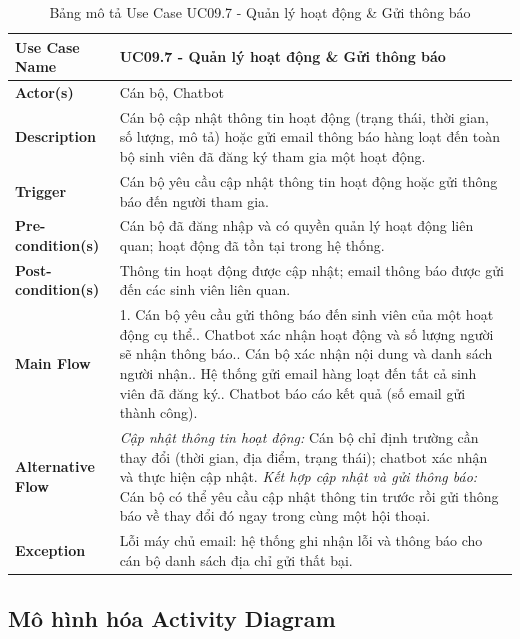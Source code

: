 \begin{table}[H]
	\centering
	\renewcommand{\arraystretch}{1.25}
	\begin{tabular}{|p{3.8cm}|p{11.2cm}|}
		\hline
		\textbf{Use Case Name} & \textbf{UC09.7 - Quản lý hoạt động \& Gửi thông báo} \\ \hline
		\textbf{Actor(s)} & Cán bộ, Chatbot \\ \hline
		\textbf{Description} & Cán bộ cập nhật thông tin hoạt động (trạng thái, thời gian, số lượng, mô tả) hoặc gửi email thông báo hàng loạt đến toàn bộ sinh viên đã đăng ký tham gia một hoạt động. \\ \hline
		\textbf{Trigger} & Cán bộ yêu cầu cập nhật thông tin hoạt động hoặc gửi thông báo đến người tham gia. \\ \hline
		\textbf{Pre-condition(s)} & Cán bộ đã đăng nhập và có quyền quản lý hoạt động liên quan; hoạt động đã tồn tại trong hệ thống. \\ \hline
		\textbf{Post-condition(s)} & Thông tin hoạt động được cập nhật; email thông báo được gửi đến các sinh viên liên quan. \\ \hline
		\textbf{Main Flow} &
		1. Cán bộ yêu cầu gửi thông báo đến sinh viên của một hoạt động cụ thể.\newline
		2. Chatbot xác nhận hoạt động và số lượng người sẽ nhận thông báo.\newline
		3. Cán bộ xác nhận nội dung và danh sách người nhận.\newline
		4. Hệ thống gửi email hàng loạt đến tất cả sinh viên đã đăng ký.\newline
		5. Chatbot báo cáo kết quả (số email gửi thành công). \\ \hline
		\textbf{Alternative Flow} &
		\textit{Cập nhật thông tin hoạt động:} Cán bộ chỉ định trường cần thay đổi (thời gian, địa điểm, trạng thái); chatbot xác nhận và thực hiện cập nhật.\newline
		\textit{Kết hợp cập nhật và gửi thông báo:} Cán bộ có thể yêu cầu cập nhật thông tin trước rồi gửi thông báo về thay đổi đó ngay trong cùng một hội thoại. \\ \hline
		\textbf{Exception} & Lỗi máy chủ email: hệ thống ghi nhận lỗi và thông báo cho cán bộ danh sách địa chỉ gửi thất bại. \\ \hline
	\end{tabular}
	\caption{Bảng mô tả Use Case UC09.7 - Quản lý hoạt động \& Gửi thông báo}
\end{table}

\subsection{Mô hình hóa Activity Diagram}


